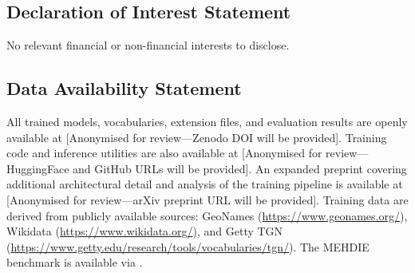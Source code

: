 \documentclass[11pt,a4paper]{article}
\begin{document}
\subsection*{Declaration of Interest Statement}

No relevant financial or non-financial interests to disclose.

\subsection*{Data Availability Statement}

All trained models, vocabularies, extension files, and evaluation results are openly available at [Anonymised for review---Zenodo DOI will be provided]. Training code and inference utilities are also available at [Anonymised for review---HuggingFace and GitHub URLs will be provided]. An expanded preprint covering additional architectural detail and analysis of the training pipeline is available at [Anonymised for review---arXiv preprint URL will be provided]. Training data are derived from publicly available sources: GeoNames (\url{https://www.geonames.org/}), Wikidata (\url{https://www.wikidata.org/}), and Getty TGN (\url{https://www.getty.edu/research/tools/vocabularies/tgn/}). The MEHDIE benchmark is available via \citet{mehdie2025}.







\clearpage
\end{document}

